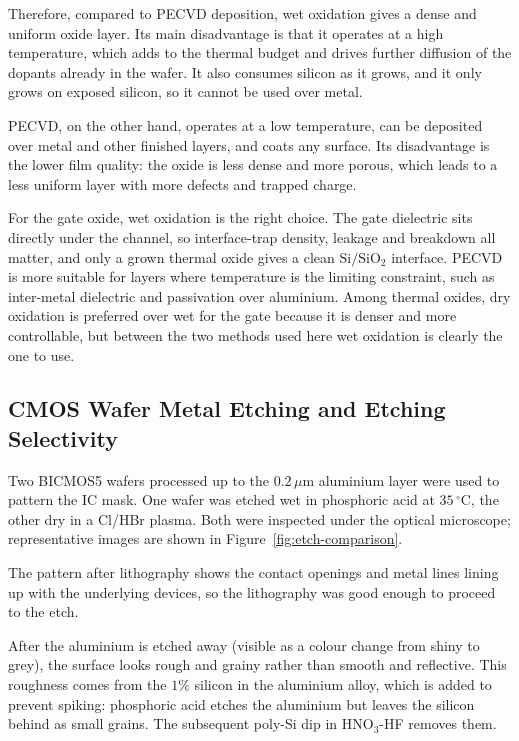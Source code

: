 Therefore, compared to PECVD deposition, wet oxidation gives a dense and uniform oxide layer. Its main disadvantage is that it operates at a high temperature, which adds to the thermal budget and drives further diffusion of the dopants already in the wafer. It also consumes silicon as it grows, and it only grows on exposed silicon, so it cannot be used over metal.

PECVD, on the other hand, operates at a low temperature, can be deposited over metal and other finished layers, and coats any surface. Its disadvantage is the lower film quality: the oxide is less dense and more porous, which leads to a less uniform layer with more defects and trapped charge.

For the gate oxide, wet oxidation is the right choice. The gate dielectric sits directly under the channel, so interface-trap density, leakage and breakdown all matter, and only a grown thermal oxide gives a clean $\mathrm{Si}/\mathrm{SiO_2}$ interface. PECVD is more suitable for layers where temperature is the limiting constraint, such as inter-metal dielectric and passivation over aluminium. Among thermal oxides, dry oxidation is preferred over wet for the gate because it is denser and more controllable, but between the two methods used here wet oxidation is clearly the one to use.


\subsection{CMOS Wafer Metal Etching and Etching Selectivity}
Two BICMOS5 wafers processed up to the $0.2\,\mu$m aluminium layer were used to pattern the IC mask. One wafer was etched wet in phosphoric acid at $35\,^\circ$C, the other dry in a Cl/HBr plasma. Both were inspected under the optical microscope; representative images are shown in Figure~\ref{fig:etch-comparison}.

The pattern after lithography shows the contact openings and metal lines lining up with the underlying devices, so the lithography was good enough to proceed to the etch.

After the aluminium is etched away (visible as a colour change from shiny to grey), the surface looks rough and grainy rather than smooth and reflective. This roughness comes from the $1\%$ silicon in the aluminium alloy, which is added to prevent spiking: phosphoric acid etches the aluminium but leaves the silicon behind as small grains. The subsequent poly-Si dip in HNO$_3$-HF removes them.

